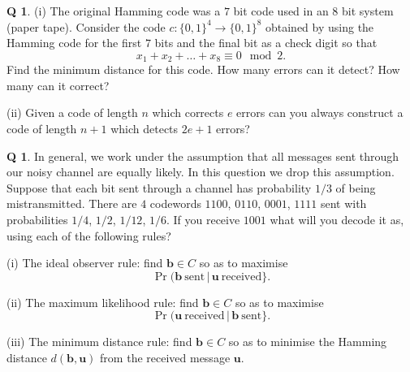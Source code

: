 \documentclass[12pt,a4paper]{article}
\theoremstyle{plain}
\theoremstyle{definition}
\newtheorem{question}[theorem]{Q}
\begin{document}
    \begin{question}
        \label{C2.11}
        (i) The original Hamming code
        was a $7$ bit code used in an $8$ bit system
        (paper tape). Consider the code $c:\{0,1\}^{4}\rightarrow\{0,1\}^{8}$
        obtained by using the Hamming code for the first $7$ bits
        and the final bit as a check digit so that
        \[x_{1}+x_{2}+\dots+x_{8}\equiv 0\mod{2}.\]
        Find the minimum distance for this code. How many errors
        can it detect? How many can it correct?

        (ii) Given a code of length $n$ which corrects $e$ errors
        can you always construct a code of length $n+1$
        which detects $2e+1$ errors?
    \end{question}
    \begin{question}
        \label{C2.12} In general,
        we work under the assumption
        that all messages sent through our noisy channel
        are equally likely. In this question
        we drop this assumption. Suppose that
        each bit sent through a channel has probability
        $1/3$ of being mistransmitted. There are $4$
        codewords $1100$, $0110$, $0001$, $1111$
        sent with probabilities $1/4$, $1/2$, $1/12$, $1/6$.
        If you receive $1001$ what will you decode it as, using
        each of the following rules?

        (i) The ideal observer rule: find ${\mathbf b}\in C$
        so as to maximise
        \[\Pr({\mathbf b}\ \text{sent}\,|\,
        {\mathbf u}\ \text{received}\}.\]

        (ii) The maximum likelihood rule: find ${\mathbf b}\in C$
        so as to maximise
        \[\Pr({\mathbf u}\ \text{received}\,|\,
        {\mathbf b}\ \text{sent}\}.\]

        (iii) The minimum distance rule: find ${\mathbf b}\in C$
        so as to minimise the Hamming distance
        $d({\mathbf b},{\mathbf u})$ from the
        received message ${\mathbf u}$.
    \end{question}
\end{document}
